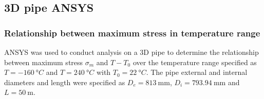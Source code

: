 \subsection{3D pipe ANSYS}\label{part1c}
\subsubsection{Relationship between maximum stress in temperature range}
ANSYS was used to conduct analysis on a 3D pipe to determine the relationship between maximum stress $\sigma_m$ and $T-T_0$ over the temperature range specified as $T = \SI{-160}{\degree C}$ and $T = \SI{240}{\degree C}$ with $T_0 = \SI{22}{\degree C}$. The pipe external and internal diameters and length were specified as $D_e = \SI{813}{\milli\meter}$, $D_i = \SI{793.94}{\milli\meter}$ and $L = \SI{50}{\meter}$.


